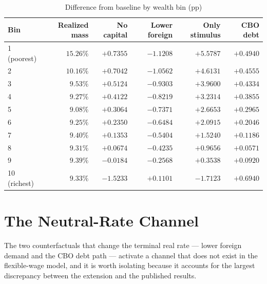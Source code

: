 \begin{table}[t]\centering
\caption{Difference from baseline by wealth bin (pp)}\label{tab:deciles}
\small
\begin{tabular}{lrrrrr}
\toprule
Bin & Realized mass & No capital & Lower foreign & Only stimulus & CBO debt \\
\midrule
1 (poorest) & $15.26\%$ & $+0.7355$ & $-1.1208$ & $+5.5787$ & $+0.4940$ \\
2           & $10.16\%$ & $+0.7042$ & $-1.0562$ & $+4.6131$ & $+0.4555$ \\
3           & $9.53\%$  & $+0.5124$ & $-0.9303$ & $+3.9600$ & $+0.4334$ \\
4           & $9.27\%$  & $+0.4122$ & $-0.8219$ & $+3.2314$ & $+0.3855$ \\
5           & $9.08\%$  & $+0.3064$ & $-0.7371$ & $+2.6653$ & $+0.2965$ \\
6           & $9.25\%$  & $+0.2350$ & $-0.6484$ & $+2.0915$ & $+0.2046$ \\
7           & $9.40\%$  & $+0.1353$ & $-0.5404$ & $+1.5240$ & $+0.1186$ \\
8           & $9.31\%$  & $+0.0674$ & $-0.4235$ & $+0.9656$ & $+0.0571$ \\
9           & $9.39\%$  & $-0.0184$ & $-0.2568$ & $+0.3538$ & $+0.0920$ \\
10 (richest)& $9.33\%$  & $-1.5233$ & $+0.1101$ & $-1.7123$ & $+0.6940$ \\
\bottomrule
\end{tabular}
\end{table}

\section{The Neutral-Rate Channel} \label{decomposition}

The two counterfactuals that change the terminal real rate --- lower foreign
demand and the CBO debt path --- activate a channel that does not exist in the
flexible-wage model, and it is worth isolating because it accounts for the
largest discrepancy between the extension and the published results.

